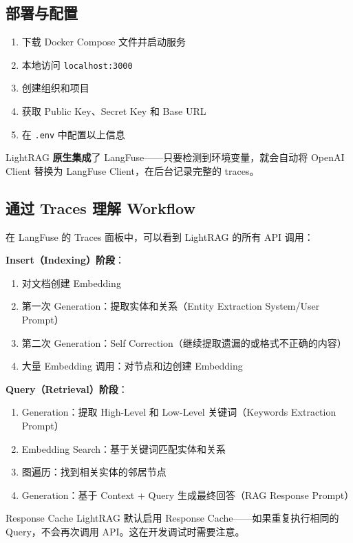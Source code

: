 \documentclass[a4paper]{article}
\begin{document}
\subsection{部署与配置}

\begin{enumerate}
    \item 下载 Docker Compose 文件并启动服务
    \item 本地访问 \texttt{localhost:3000}
    \item 创建组织和项目
    \item 获取 Public Key、Secret Key 和 Base URL
    \item 在 \texttt{.env} 中配置以上信息
\end{enumerate}

LightRAG \textbf{原生集成}了 LangFuse——只要检测到环境变量，就会自动将 OpenAI Client 替换为 LangFuse Client，在后台记录完整的 traces。

\subsection{通过 Traces 理解 Workflow}

在 LangFuse 的 Traces 面板中，可以看到 LightRAG 的所有 API 调用：

\textbf{Insert（Indexing）阶段}：
\begin{enumerate}
    \item 对文档创建 Embedding
    \item 第一次 Generation：提取实体和关系（Entity Extraction System/User Prompt）
    \item 第二次 Generation：Self Correction（继续提取遗漏的或格式不正确的内容）
    \item 大量 Embedding 调用：对节点和边创建 Embedding
\end{enumerate}

\textbf{Query（Retrieval）阶段}：
\begin{enumerate}
    \item Generation：提取 High-Level 和 Low-Level 关键词（Keywords Extraction Prompt）
    \item Embedding Search：基于关键词匹配实体和关系
    \item 图遍历：找到相关实体的邻居节点
    \item Generation：基于 Context + Query 生成最终回答（RAG Response Prompt）
\end{enumerate}

\begin{warningbox}{Response Cache}
LightRAG 默认启用 Response Cache——如果重复执行相同的 Query，不会再次调用 API。这在开发调试时需要注意。
\end{warningbox}
\end{document}

